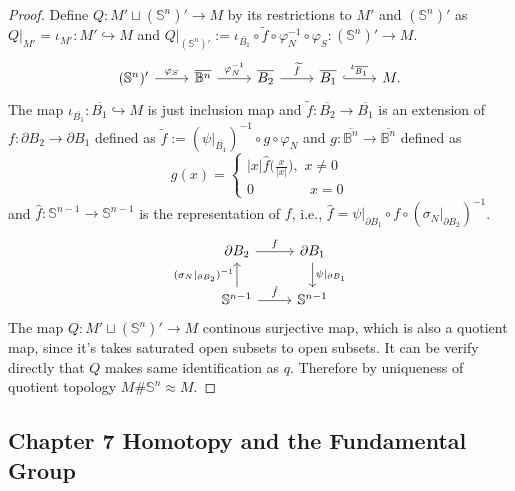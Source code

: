 \documentclass[a4paper]{article}
\theoremstyle{remark}
\newcommand{\s}{\mathbb{S}} %
\newcommand{\doo}{\partial}    %
\begin{document}
\begin{proof}
	Define $Q :  M' \sqcup (\s^n)' \to M$ by its restrictions to $M'$ and $(\s^n)'$ as $Q|_{M'} = \iota_{M'} : M' \hookrightarrow M$ and $Q|_{(\s^n)'} := \iota_{\overline{B_1}} \circ \widetilde{f} \circ \varphi_N^{-1} \circ \varphi_S : (\s^n)' \to M$. 
	\[
	\begin{tikzcd}
	(\s^n)' \arrow[r,"\varphi_S"] &  \overline{\mathbb{B}^n}  \arrow[r,"\varphi_N^{-1}"] & \overline{B_2} \arrow[r,"\widetilde{f}"] & \overline{B_1} \arrow[r,"\iota_{\overline{B_1}}",hookrightarrow] & M.
	\end{tikzcd}
	\]	
	The map $\iota_{\overline{B_1}}  : \overline{B_1} \hookrightarrow M $ is just inclusion map and $\widetilde{f} : \overline{B_2} \to \overline{B_1}$ is an extension of $f : \doo B_2 \to \doo B_1$ defined as $\widetilde{f} := (\psi|_{\overline{B_1}})^{-1} \circ g \circ \varphi_N$ and $g : \overline{\mathbb{B}^n} \to \overline{\mathbb{B}^n}$ defined as
	\[
	g(x)=\left\{
	\begin{array}{ll}
	|x| \hat{f} \big(\frac{x}{|x|}\big),\, \, x \neq 0\\
	0  \qquad \qquad x=0
	\end{array}
	\right.
	\]
	and $\hat{f} : \s^{n-1} \to \s^{n-1}$ is the representation of $f$, i.e., $\hat{f} = \psi|_{\doo B_1} \circ f \circ (\sigma_N|_{\doo B_2})^{-1}$.
	\[
	\begin{tikzcd}
	\doo B_2  \arrow[r,"f"] & \doo B_1 \arrow[d,"\psi|_{\doo B_1}"] \\
	\s^{n-1} \arrow[u,"(\sigma_N|_{\doo B_2})^{-1}"] \arrow[r,"\hat{f}"] & \s^{n-1}
	\end{tikzcd}
	\]
    The map $Q :  M' \sqcup (\s^n)' \to M$ continous surjective map, which is also a quotient map, since it's takes saturated open subsets to open subsets. It can be verify directly that $Q$ makes same identification as $q$. Therefore by uniqueness of quotient topology $M\#\s^n \approx M$. 
\end{proof}

\subsection*{Chapter 7 Homotopy and the Fundamental Group}
\end{document}
